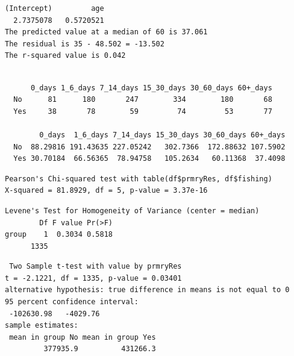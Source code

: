 \documentclass{article}\usepackage[]{graphicx}\usepackage[]{color}
\makeatletter
\newenvironment{kframe}{%
 \def\at@end@of@kframe{}%
 \ifinner\ifhmode%
  \def\at@end@of@kframe{\end{minipage}}%
  \begin{minipage}{\columnwidth}%
 \fi\fi%
 \def\FrameCommand##1{\hskip\@totalleftmargin \hskip-\fboxsep
 \colorbox{shadecolor}{##1}\hskip-\fboxsep
     \hskip-\linewidth \hskip-\@totalleftmargin \hskip\columnwidth}%
 \MakeFramed {\advance\hsize-\width
   \@totalleftmargin\z@ \linewidth\hsize
   \@setminipage}}%
 {\par\unskip\endMakeFramed%
 \at@end@of@kframe}
\newenvironment{knitrout}{}{} %
\makeatother
\begin{document}
\begin{knitrout}
\color{fgcolor}\begin{kframe}
\begin{verbatim}
(Intercept)         age 
  2.7375078   0.5720521 
The predicted value at a median of 60 is 37.061
The residual is 35 - 48.502 = -13.502
The r-squared value is 0.042
\end{verbatim}
\end{kframe}
\end{knitrout}

\clearpage
\begin{knitrout}
\color{fgcolor}\begin{kframe}
\begin{verbatim}
     
      0_days 1_6_days 7_14_days 15_30_days 30_60_days 60+_days
  No      81      180       247        334        180       68
  Yes     38       78        59         74         53       77
     
        0_days  1_6_days 7_14_days 15_30_days 30_60_days 60+_days
  No  88.29816 191.43635 227.05242   302.7366  172.88632 107.5902
  Yes 30.70184  66.56365  78.94758   105.2634   60.11368  37.4098
\end{verbatim}
\end{kframe}
\end{knitrout}
\begin{knitrout}
\color{fgcolor}\begin{kframe}
\begin{verbatim}
Pearson's Chi-squared test with table(df$prmryRes, df$fishing) 
X-squared = 81.8929, df = 5, p-value = 3.37e-16
\end{verbatim}
\end{kframe}
\end{knitrout}
\begin{knitrout}
\color{fgcolor}\begin{kframe}
\begin{verbatim}
Levene's Test for Homogeneity of Variance (center = median)
        Df F value Pr(>F)
group    1  0.3034 0.5818
      1335               
\end{verbatim}
\end{kframe}
\end{knitrout}
\begin{knitrout}
\color{fgcolor}\begin{kframe}
\begin{verbatim}
 Two Sample t-test with value by prmryRes 
t = -2.1221, df = 1335, p-value = 0.03401
alternative hypothesis: true difference in means is not equal to 0 
95 percent confidence interval:
 -102630.98   -4029.76 
sample estimates:
 mean in group No mean in group Yes 
         377935.9          431266.3 
\end{verbatim}
\end{kframe}
\end{knitrout}
\end{document}
